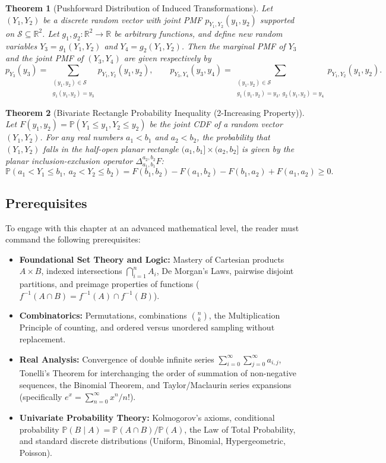 \documentclass[11pt, letterpaper]{article}
\newtheorem{theorem}{Theorem}[section]
\theoremstyle{definition}
\theoremstyle{remark}
\newcommand{\R}{\mathbb{R}}
\newcommand{\Prob}{\mathbb{P}}
\begin{document}
\begin{theorem}[Pushforward Distribution of Induced Transformations]
\label{thm:induced_transformation}
Let $(Y_1, Y_2)$ be a discrete random vector with joint PMF $p_{Y_1, Y_2}(y_1, y_2)$ supported on $\mathcal{S} \subseteq \R^2$. Let $g_1, g_2 : \R^2 \to \R$ be arbitrary functions, and define new random variables $Y_3 = g_1(Y_1, Y_2)$ and $Y_4 = g_2(Y_1, Y_2)$. Then the marginal PMF of $Y_3$ and the joint PMF of $(Y_3, Y_4)$ are given respectively by
\[
p_{Y_3}(y_3) = \sum_{\substack{(y_1, y_2) \in \mathcal{S} \\ g_1(y_1, y_2) = y_3}} p_{Y_1, Y_2}(y_1, y_2), \qquad
p_{Y_3, Y_4}(y_3, y_4) = \sum_{\substack{(y_1, y_2) \in \mathcal{S} \\ g_1(y_1, y_2) = y_3,\ g_2(y_1, y_2) = y_4}} p_{Y_1, Y_2}(y_1, y_2).
\]
\end{theorem}

\begin{theorem}[Bivariate Rectangle Probability Inequality (2-Increasing Property)]
\label{thm:rectangle_prob}
Let $F(y_1, y_2) = \Prob(Y_1 \le y_1, Y_2 \le y_2)$ be the joint CDF of a random vector $(Y_1, Y_2)$. For any real numbers $a_1 < b_1$ and $a_2 < b_2$, the probability that $(Y_1, Y_2)$ falls in the half-open planar rectangle $(a_1, b_1] \times (a_2, b_2]$ is given by the planar inclusion-exclusion operator $\Delta_{a_1, b_1}^{a_2, b_2} F$:
\[
\Prob(a_1 < Y_1 \le b_1,\ a_2 < Y_2 \le b_2) = F(b_1, b_2) - F(a_1, b_2) - F(b_1, a_2) + F(a_1, a_2) \ge 0.
\]
\end{theorem}

\subsection{Prerequisites}

To engage with this chapter at an advanced mathematical level, the reader must command the following prerequisites:
\begin{itemize}
    \item \textbf{Foundational Set Theory and Logic:} Mastery of Cartesian products $A \times B$, indexed intersections $\bigcap_{i=1}^n A_i$, De Morgan's Laws, pairwise disjoint partitions, and preimage properties of functions ($f^{-1}(A \cap B) = f^{-1}(A) \cap f^{-1}(B)$).
    \item \textbf{Combinatorics:} Permutations, combinations $\binom{n}{k}$, the Multiplication Principle of counting, and ordered versus unordered sampling without replacement.
    \item \textbf{Real Analysis:} Convergence of double infinite series $\sum_{i=0}^\infty \sum_{j=0}^\infty a_{i,j}$, Tonelli's Theorem for interchanging the order of summation of non-negative sequences, the Binomial Theorem, and Taylor/Maclaurin series expansions (specifically $e^x = \sum_{n=0}^\infty x^n / n!$).
    \item \textbf{Univariate Probability Theory:} Kolmogorov's axioms, conditional probability $\Prob(B \mid A) = \Prob(A \cap B)/\Prob(A)$, the Law of Total Probability, and standard discrete distributions (Uniform, Binomial, Hypergeometric, Poisson).
\end{itemize}
\end{document}
